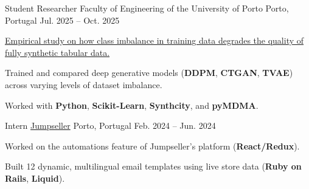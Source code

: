 
\begin{cventries}
    \cventry
      {Student Researcher} %
      {Faculty of Engineering of the University of Porto} %
      {Porto, Portugal} %
      {Jul. 2025 -- Oct. 2025} %
      {
        \begin{cvitems}
          \item {\href{https://www.adrianomachado.pt/work/imbalance-synthetic-data}{Empirical study on how class imbalance in training data degrades the quality of fully synthetic tabular data.}}
          \item {Trained and compared deep generative models (\textbf{DDPM}, \textbf{CTGAN}, \textbf{TVAE}) across varying levels of dataset imbalance.}
          \item {Worked with \textbf{Python}, \textbf{Scikit-Learn}, \textbf{Synthcity}, and \textbf{pyMDMA}.}
        \end{cvitems}
      }
  \cventry
    {Intern}
    {\href{https://jumpseller.com/}{Jumpseller}} %
    {Porto, Portugal}
    {Feb. 2024 -- Jun. 2024}
    {
        \begin{cvitems}
          \item {Worked on the automations feature of Jumpseller's platform (\textbf{React/Redux}).}
          \item {Built 12 dynamic, multilingual email templates using live store data (\textbf{Ruby on Rails}, \textbf{Liquid}).}
        \end{cvitems}
    }
\end{cventries}